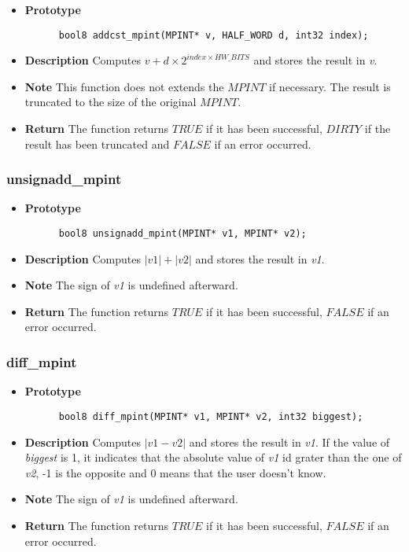 \documentclass[10pt,a4paper]{article}
\begin{document}
  \begin{itemize}
    \item [] \textbf{Prototype}
    \begin{lstlisting}
      bool8 addcst_mpint(MPINT* v, HALF_WORD d, int32 index);
    \end{lstlisting}
    \item [] \textbf{Description} Computes $v + d \times 2^{index \times HW\_BITS}$ and stores the result in \textit{v}.
    \item [] \textbf{Note} This function does not extends the $MPINT$ if necessary. The result is truncated to the size of the original $MPINT$.
    \item [] \textbf{Return} The function returns $TRUE$ if it has been successful, $DIRTY$ if the result has been truncated and $FALSE$ if an error
    occurred.
  \end{itemize}
  
  \subsubsection{unsignadd\_mpint}
  
  \begin{itemize}
    \item [] \textbf{Prototype}
    \begin{lstlisting}
      bool8 unsignadd_mpint(MPINT* v1, MPINT* v2);
    \end{lstlisting}
    \item [] \textbf{Description} Computes $|v1| + |v2|$ and stores the result in \textit{v1}. 
    \item [] \textbf{Note} The sign of \textit{v1} is undefined afterward.
    \item [] \textbf{Return} The function returns $TRUE$ if it has been successful, $FALSE$ if an error occurred.
  \end{itemize}
  
  \subsubsection{diff\_mpint}
  
  \begin{itemize}
    \item [] \textbf{Prototype}
    \begin{lstlisting}
      bool8 diff_mpint(MPINT* v1, MPINT* v2, int32 biggest);
    \end{lstlisting}
    \item [] \textbf{Description} Computes $|v1 - v2|$ and stores the result in \textit{v1}. If the value of \textit{biggest} is 1, it indicates that the absolute value of \textit{v1}
    id grater than the one of \textit{v2}, -1 is the opposite and 0 means that the user doesn't know.
    \item [] \textbf{Note} The sign of \textit{v1} is undefined afterward.
    \item [] \textbf{Return} The function returns $TRUE$ if it has been successful, $FALSE$ if an error occurred.
  \end{itemize}
  
\end{document}
